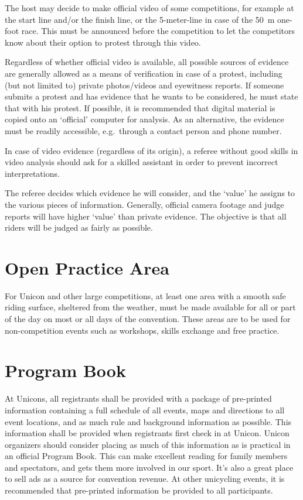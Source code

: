 The host may decide to make official video of some competitions, for example at the start line and/or the finish line, or the 5-meter-line in case of the 50~m one-foot race.
This must be announced before the competition to let the competitors know about their option to protest through this video.

Regardless of whether official video is available, all possible sources of evidence are generally allowed as a means of verification in case of a protest, including (but not limited to) private photos/videos and eyewitness reports.
If someone submits a protest and has evidence that he wants to be considered, he must state that with his protest.
If possible, it is recommended that digital material is copied onto an `official' computer for analysis.
As an alternative, the evidence must be readily accessible, e.g.\ through a contact person and phone number.

In case of video evidence (regardless of its origin), a referee without good skills in video analysis should ask for a skilled assistant in order to prevent incorrect interpretations.

The referee decides which evidence he will consider, and the `value' he assigns to the various pieces of information.
Generally, official camera footage and judge reports will have higher `value' than private evidence.
The objective is that all riders will be judged as fairly as possible.

\section{Open Practice Area}
For Unicon and other large competitions, at least one area with a smooth safe riding surface, sheltered from the weather, must be made available for all or part of the day on most or all days of the convention.
These areas are to be used for non-competition events such as workshops, skills exchange and free practice.

\section{Program Book}

At Unicons, all registrants shall be provided with a package of pre-printed information containing a full schedule of all events, maps and directions to all event locations, and as much rule and background information as possible.
This information shall be provided when registrants first check in at Unicon.
Unicon organizers should consider placing as much of this information as is practical in an official Program Book.
This can make excellent reading for family members and spectators, and gets them more involved in our sport.
It's also a great place to sell ads as a source for convention revenue.
At other unicycling events, it is recommended that pre-printed information be provided to all participants.


